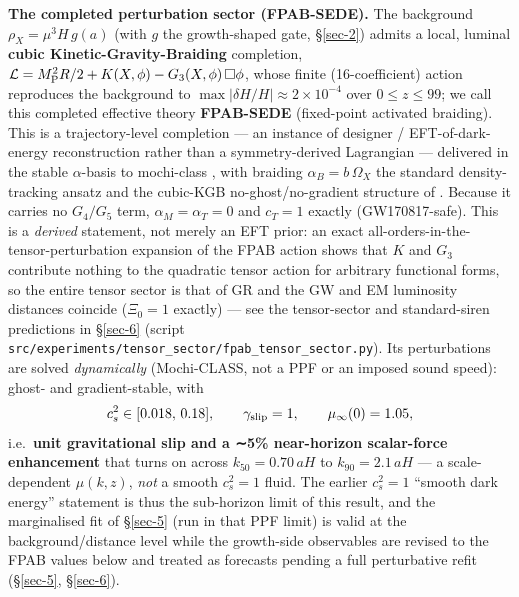 \documentclass[preprint,12pt]{elsarticle}
\begin{document}
\textbf{The completed perturbation sector (FPAB-SEDE).} The background
\(\rho_X = \mu^3 H\,g(a)\) (with \(g\) the growth-shaped gate,
§\ref{sec-2}) admits a local, luminal \textbf{cubic
Kinetic-Gravity-Braiding} completion,
\(\mathcal{L} = M_{\rm P}^2 R/2 + K(X,\phi) - G_3(X,\phi)\,\Box\phi\),
whose finite (16-coefficient) action reproduces the background to
\(\max|\delta H/H| \approx 2\times10^{-4}\) over \(0 \le z \le 99\); we
call this completed effective theory \textbf{FPAB-SEDE} (fixed-point
activated braiding). This is a trajectory-level completion --- an
instance of designer / EFT-of-dark-energy reconstruction
\citep{Kennedy:2017sof, Gubitosi:2012hu, Gleyzes:2014dya} rather than a
symmetry-derived Lagrangian --- delivered in the stable \(\alpha\)-basis
\citep{Bellini:2014fua} to mochi-class
\citep{Cataneo:2024uox, Zumalacarregui:2016pph}, with braiding
\(\alpha_B = b\,\Omega_X\) the standard density-tracking ansatz and the
cubic-KGB no-ghost/no-gradient structure of
\citep{Deffayet:2011gz, Kobayashi:2011nu}. Because it carries no
\(G_4/G_5\) term, \(\alpha_M = \alpha_T = 0\) and \(c_T = 1\) exactly
(GW170817-safe). This is a \emph{derived} statement, not merely an EFT
prior: an exact all-orders-in-the-tensor-perturbation expansion of the
FPAB action shows that \(K\) and \(G_3\) contribute nothing to the
quadratic tensor action for arbitrary functional forms, so the entire
tensor sector is that of GR and the GW and EM luminosity distances
coincide (\(\Xi_0 = 1\) exactly) --- see the tensor-sector and
standard-siren predictions in §\ref{sec-6} (script
\texttt{src/\allowbreak experiments/\allowbreak tensor\_\allowbreak sector/\allowbreak fpab\_\allowbreak tensor\_\allowbreak sector.\allowbreak py}). Its
perturbations are solved \emph{dynamically} (Mochi-CLASS, not a PPF or
an imposed sound speed): ghost- and gradient-stable, with
\begin{equation}c_s^2 \in [0.018,\,0.18],\qquad \gamma_{\rm slip}=1,\qquad \mu_\infty(0)=1.05,\end{equation}
i.e.~\textbf{unit gravitational slip and a ∼5\% near-horizon
scalar-force enhancement} that turns on across \(k_{50} = 0.70\,aH\) to
\(k_{90} = 2.1\,aH\) --- a scale-dependent \(\mu(k,z)\), \emph{not} a
smooth \(c_s^2=1\) fluid. The earlier \(c_s^2=1\) ``smooth dark energy''
statement is thus the sub-horizon limit of this result, and the
marginalised fit of §\ref{sec-5} (run in that PPF limit) is valid at the
background/distance level while the growth-side observables are revised
to the FPAB values below and treated as forecasts pending a full
perturbative refit (§\ref{sec-5}, §\ref{sec-6}).
\end{document}
